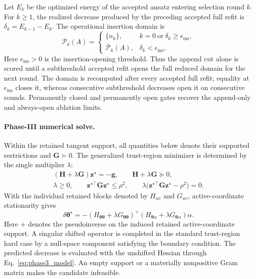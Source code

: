 \documentclass[
  reprint,
  amsmath,
  amssymb,
  aps,
  pra,
  nofootinbib,
  superscriptaddress,
  floatfix
]{revtex4-2}
\begin{document}
Let \(E_k\) be the optimized energy of the accepted ansatz entering selection
round \(k\). For \(k\ge1\), the realized decrease produced by the preceding
accepted full refit is \(\delta_k=E_{k-1}-E_k\). The operational insertion
domain is
\begin{equation}
\mathcal P_k(A)
=
\begin{cases}
\{n_k\},
& k=0\ \text{or}\ \delta_k\ge\epsilon_{\mathrm{ins}},\\
\overline{\mathcal P}_k(A),
& \delta_k<\epsilon_{\mathrm{ins}},
\end{cases}
\label{eq:insertion_gate}
\end{equation}
Here \(\epsilon_{\mathrm{ins}}>0\) is the insertion-opening threshold. Thus
the append cut alone is scored until a subthreshold accepted refit opens
the full reduced domain for the next round. The domain is recomputed after
every accepted full refit; equality at \(\epsilon_{\mathrm{ins}}\) closes it,
whereas consecutive subthreshold decreases open it on consecutive rounds.
Permanently closed and permanently open gates recover the append-only and
always-open ablation limits.

\paragraph*{Phase-III numerical solve.}
Within the retained tangent support, all quantities below denote their supported
restrictions and \(\mathbf G\succ0\). The generalized trust-region minimizer is
determined by the single multiplier \(\lambda\):
\begin{equation*}
\begin{gathered}
(\mathbf H+\lambda\mathbf G)\mathbf z^\star=-\mathbf g,
\qquad
\mathbf H+\lambda\mathbf G\succeq0,\\
\lambda\ge0,
\qquad
\mathbf z^{\star\top}\mathbf G\mathbf z^\star\le\rho^2,
\qquad
\lambda\bigl(\mathbf z^{\star\top}\mathbf G\mathbf z^\star-\rho^2\bigr)=0.
\end{gathered}
\end{equation*}
With the individual retained blocks denoted by \(H_{uv}\) and \(G_{uv}\),
active-coordinate stationarity gives
\begin{equation}
\delta\boldsymbol{\theta}^{\star}
=
-\left(
H_{\boldsymbol\theta\boldsymbol\theta}
+\lambda G_{\boldsymbol\theta\boldsymbol\theta}
\right)^{+}
\left(
H_{\boldsymbol\theta\alpha}
+\lambda G_{\boldsymbol\theta\alpha}
\right)\alpha .
\label{eq:phase3_ansatz_response}
\end{equation}
Here \(+\) denotes the pseudoinverse on the induced retained
active-coordinate support. A singular shifted operator is completed in the
standard trust-region hard case by a null-space component satisfying the
boundary condition.
The predicted decrease is evaluated with the unshifted Hessian through
Eq.~\eqref{eq:phase3_model}. An empty support or a materially nonpositive Gram
matrix makes the candidate infeasible.
\end{document}
